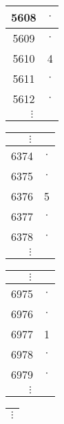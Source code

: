 \begin{frame}
{\begin{figure}[ht!]
\begin{adjustbox}{width = \textwidth}
\begin{tabular}{cc}
				\multicolumn{1}{|c|}{5608}		& \multicolumn{1}{c|}{$\cdot$} 		\\ 	\hline
				\multicolumn{1}{|c|}{5609}		& \multicolumn{1}{c|}{$\cdot$} 		\\ 	\hline
				\multicolumn{1}{|c|}{5610}		& \multicolumn{1}{c|}{4}       		\\ 	\hline
				\multicolumn{1}{|c|}{5611}		& \multicolumn{1}{c|}{$\cdot$} 		\\ 	\hline
				\multicolumn{1}{|c|}{5612}		& \multicolumn{1}{c|}{$\cdot$} 		\\ 	\hline
				\multicolumn{2}{c}{$\vdots$}                                  
			\end{tabular}
			\begin{tabular}{cc}
				\multicolumn{2}{c}{$\vdots$}                                   		\\ 	\hline
				\multicolumn{1}{|c|}{6374}		& \multicolumn{1}{c|}{$\cdot$} 		\\ 	\hline
				\multicolumn{1}{|c|}{6375}		& \multicolumn{1}{c|}{$\cdot$} 		\\ 	\hline
				\multicolumn{1}{|c|}{6376}		& \multicolumn{1}{c|}{5}       		\\ 	\hline
				\multicolumn{1}{|c|}{6377}		& \multicolumn{1}{c|}{$\cdot$} 		\\ 	\hline
				\multicolumn{1}{|c|}{6378}		& \multicolumn{1}{c|}{$\cdot$} 		\\ 	\hline
				\multicolumn{2}{c}{$\vdots$}                                  
			\end{tabular}
			\begin{tabular}{cc}
				\multicolumn{2}{c}{$\vdots$}                                   		\\ 	\hline
				\multicolumn{1}{|c|}{6975}		& \multicolumn{1}{c|}{$\cdot$} 		\\ 	\hline
				\multicolumn{1}{|c|}{6976}		& \multicolumn{1}{c|}{$\cdot$} 		\\ 	\hline
				\multicolumn{1}{|c|}{6977}		& \multicolumn{1}{c|}{1}       		\\ 	\hline
				\multicolumn{1}{|c|}{6978}		& \multicolumn{1}{c|}{$\cdot$} 		\\ 	\hline
				\multicolumn{1}{|c|}{6979}		& \multicolumn{1}{c|}{$\cdot$} 		\\ 	\hline
				\multicolumn{2}{c}{$\vdots$}                                  
			\end{tabular}
			\begin{tabular}{cc}
				\multicolumn{2}{c}{$\vdots$}                                   		\\ 	\hline

\end{tabular}
\end{adjustbox}
\end{figure}}
\end{frame}
